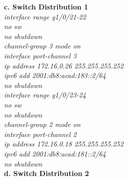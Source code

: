 \documentclass[12pt,a4paper]{report}
\begin{document}
\hspace*{1cm}\textbf{c. Switch Distribution 1}\\
\hspace*{2cm}\textit{interface range g1/0/21-22\\
\hspace*{2cm}no sw\\
\hspace*{2cm}no shutdown\\
\hspace*{2cm}channel-group 3 mode on \\
\hspace*{2cm}interface port-channel 3\\
\hspace*{2cm}ip address 172.16.0.26 255.255.255.252\\
\hspace*{2cm}ipv6 add 2001:db8:acad:183::2/64\\
\hspace*{2cm}no shutdown\\
\hspace*{2cm}interface range g1/0/23-24\\
\hspace*{2cm}no sw\\
\hspace*{2cm}no shutdown\\
\hspace*{2cm}channel-group 2 mode on \\
\hspace*{2cm}interface port-channel 2\\
\hspace*{2cm}ip address 172.16.0.18 255.255.255.252\\
\hspace*{2cm}ipv6 add 2001:db8:acad:181::2/64\\
\hspace*{2cm}no shutdown\\}
\hspace*{1cm}\textbf{d. Switch Distribution 2}\\
\end{document}
